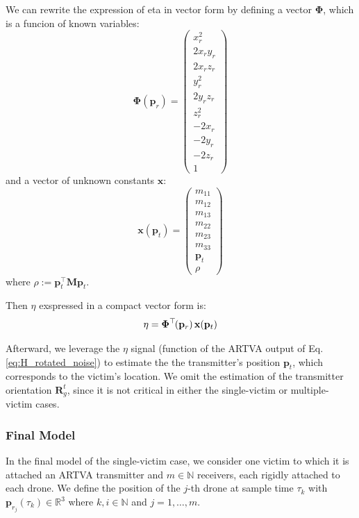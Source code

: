 \noindent
We can rewrite the expression of eta in vector form by defining a vector $\mathbf{\Phi}$,
which is a funcion of known variables:
\begin{equation}
\renewcommand{\arraystretch}{1}
\mathbf{\Phi}(\mathbf{p}_{r}) = 
\begin{pmatrix}
x_r^2 \\
2x_r y_r \\
2x_r z_r \\
y_r^2 \\
2y_r z_r \\
z_r^2 \\
-2x_r \\
-2y_r \\
-2z_r \\
1
\end{pmatrix}
\label{eq:Phi_vector}
\end{equation}
and a vector of unknown constants $\mathbf{x}$:
\begin{equation}
\renewcommand{\arraystretch}{1}
\mathbf{x}(\mathbf{p}_t) = 
\begin{pmatrix}
m_{11} \\
m_{12} \\
m_{13} \\
m_{22} \\
m_{23} \\
m_{33} \\
\mathbf{p}_t \\
\rho
\end{pmatrix}
\label{eq:x_vector}
\end{equation}  
where \( \rho := \mathbf{p}_t^\top \mathbf{M} \mathbf{p}_t \).

\noindent
Then $\eta$ exspressed in a compact vector form is:
\begin{equation}
    \eta = \mathbf{\Phi}^\top\mkern-2mu(\mathbf{p}_{r}) \, \mathbf{x}(\mathbf{p}_t)
    \label{eq:eta_final_final}
\end{equation}

\noindent
Afterward, we leverage the $\eta$ signal (function of the ARTVA output
of Eq. \ref{eq:H_rotated_noise}) to estimate the
the transmitter’s position \( \mathbf{p}_t \), which corresponds to the victim's location. 
We omit the estimation of the transmitter orientation \( \mathbf{R}_g^t \),
since it is not critical in either the single-victim or multiple-victim cases.

\subsubsection{Final Model}
\noindent
In the final model of the single-victim case, we consider one victim to 
which it is attached an ARTVA transmitter and \( m \in \mathbb{N} \) receivers, 
each rigidly attached to each drone. 
We define the position of the $j$-th drone at sample time \( \tau_k \) with \( \mathbf{p}_{r_j}(\tau_k) \in \mathbb{R}^3 \) 
where \( k, i \in \mathbb{N} \) and \( j = 1, \ldots, m \).

